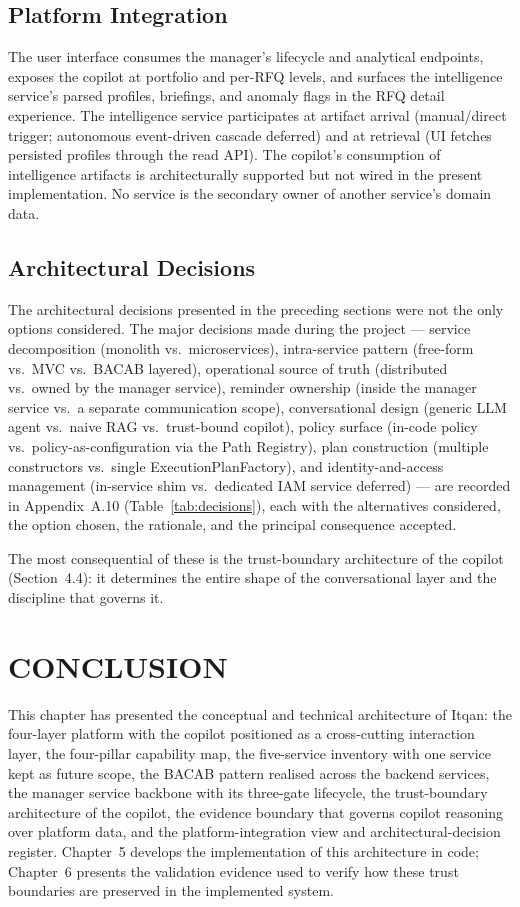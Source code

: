 \subsection{Platform Integration}
The user interface consumes the manager's lifecycle and analytical endpoints, exposes the copilot at portfolio and per-RFQ levels, and surfaces the intelligence service's parsed profiles, briefings, and anomaly flags in the RFQ detail experience. The intelligence service participates at artifact arrival (manual/direct trigger; autonomous event-driven cascade deferred) and at retrieval (UI fetches persisted profiles through the read API). The copilot's consumption of intelligence artifacts is architecturally supported but not wired in the present implementation. No service is the secondary owner of another service's domain data.

\subsection{Architectural Decisions}
The architectural decisions presented in the preceding sections were not the only options considered. The major decisions made during the project --- service decomposition (monolith vs.\ microservices), intra-service pattern (free-form vs.\ MVC vs.\ BACAB layered), operational source of truth (distributed vs.\ owned by the manager service), reminder ownership (inside the manager service vs.\ a separate communication scope), conversational design (generic LLM agent vs.\ naive RAG vs.\ trust-bound copilot), policy surface (in-code policy vs.\ policy-as-configuration via the Path Registry), plan construction (multiple constructors vs.\ single ExecutionPlanFactory), and identity-and-access management (in-service shim vs.\ dedicated IAM service deferred) --- are recorded in Appendix~A.10 (Table~\ref{tab:decisions}), each with the alternatives considered, the option chosen, the rationale, and the principal consequence accepted.

The most consequential of these is the trust-boundary architecture of the copilot (Section~4.4): it determines the entire shape of the conversational layer and the discipline that governs it.

\section*{CONCLUSION}
This chapter has presented the conceptual and technical architecture of Itqan: the four-layer platform with the copilot positioned as a cross-cutting interaction layer, the four-pillar capability map, the five-service inventory with one service kept as future scope, the BACAB pattern realised across the backend services, the manager service backbone with its three-gate lifecycle, the trust-boundary architecture of the copilot, the evidence boundary that governs copilot reasoning over platform data, and the platform-integration view and architectural-decision register. Chapter~5 develops the implementation of this architecture in code; Chapter~6 presents the validation evidence used to verify how these trust boundaries are preserved in the implemented system.